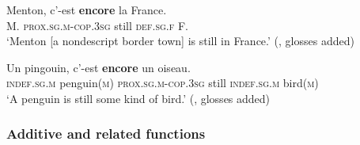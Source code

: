 \begin{exe}
		
	\ex\label{exAppendixFrenchEncoreMarginal4}
	\gll Menton, c'-est \textbf{encore} la France.\\
	M. \textsc{prox}.\textsc{sg}.\textsc{m}-\textsc{cop}.3\textsc{sg} still \textsc{def}.\textsc{sg}.\textsc{f} F.\\
	\glt \lq Menton [a nondescript border town] is still in France.' (\cite[180]{MosegaardHansen2008}, glosses added)
	
	\ex\label{exAppendixFrenchEncoreMarginal5}
	\gll Un pingouin, c’-est \textbf{encore} un oiseau.\\
	\textsc{indef}.\textsc{sg}.\textsc{m} penguin(\textsc{m}) \textsc{prox}.\textsc{sg}.\textsc{m}-\textsc{cop}.3\textsc{sg} still \textsc{indef}.\textsc{sg}.\textsc{m} bird(\textsc{m})\\
	\glt \lq A penguin is still some kind of bird.\rq{ }(\cite[180]{MosegaardHansen2008}, glosses added)
	
\end{exe}
\subsubsection{Additive and related functions}

